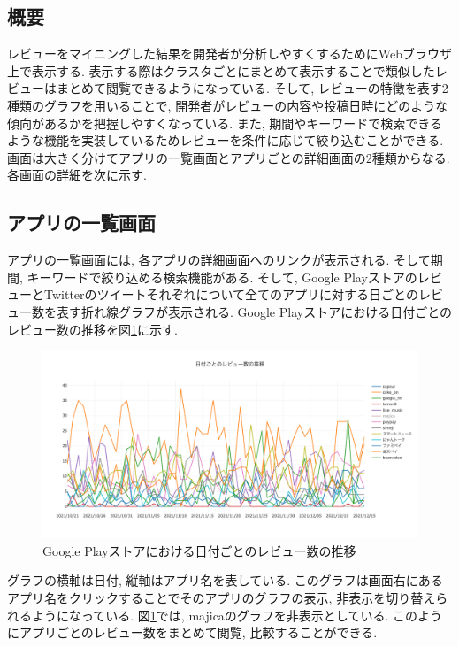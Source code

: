 \subsection{概要}
レビューをマイニングした結果を開発者が分析しやすくするためにWebブラウザ上で表示する. 表示する際はクラスタごとにまとめて表示することで類似したレビューはまとめて閲覧できるようになっている. 
そして, レビューの特徴を表す2種類のグラフを用いることで, 開発者がレビューの内容や投稿日時にどのような傾向があるかを把握しやすくなっている. また, 期間やキーワードで検索できるような機能を実装しているためレビューを条件に応じて絞り込むことができる. 
画面は大きく分けてアプリの一覧画面とアプリごとの詳細画面の2種類からなる. 各画面の詳細を次に示す. 

\subsection{アプリの一覧画面}
アプリの一覧画面には, 各アプリの詳細画面へのリンクが表示される. そして期間, キーワードで絞り込める検索機能がある. 
そして, Google PlayストアのレビューとTwitterのツイートそれぞれについて全てのアプリに対する日ごとのレビュー数を表す折れ線グラフが表示される. 
Google Playストアにおける日付ごとのレビュー数の推移を図\ref{fig:all_review}に示す. 

\begin{figure}[H]
  \centering
  \includegraphics[scale=0.32]
    {contents/images/all_review.png}
  \caption{Google Playストアにおける日付ごとのレビュー数の推移\label{fig:all_review}}
\end{figure}
\noindent
グラフの横軸は日付, 縦軸はアプリ名を表している. このグラフは画面右にあるアプリ名をクリックすることでそのアプリのグラフの表示, 非表示を切り替えられるようになっている. 図\ref{fig:all_review}では, majicaのグラフを非表示としている. 
このようにアプリごとのレビュー数をまとめて閲覧, 比較することができる. 

